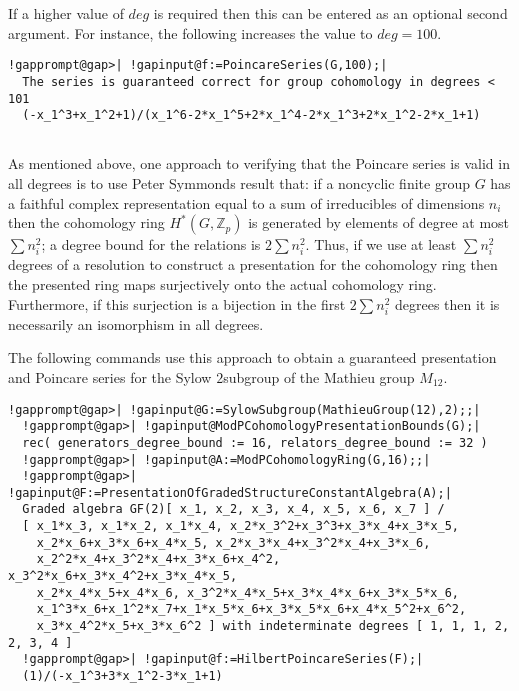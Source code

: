 \documentclass[a4paper,11pt]{report}
\begin{document}
{{\begin{Verbatim}[commandchars=!@|,fontsize=\small,frame=single,label=Example]
\end{Verbatim}
 

If a higher value of $deg$ is required then this can be entered as an optional second argument. For
instance, the following increases the value to $deg=100$. 
\begin{Verbatim}[commandchars=!@|,fontsize=\small,frame=single,label=Example]
  !gapprompt@gap>| !gapinput@f:=PoincareSeries(G,100);|
  The series is guaranteed correct for group cohomology in degrees < 101
  (-x_1^3+x_1^2+1)/(x_1^6-2*x_1^5+2*x_1^4-2*x_1^3+2*x_1^2-2*x_1+1)
  
\end{Verbatim}
 

 As mentioned above, one approach to verifying that the Poincare series is
valid in all degrees is to use Peter Symmonds result \cite{Symmonds} that: if a non\texttt{}cyclic finite group $G$ has a faithful complex representation equal to a sum of irreducibles of
dimensions $n_i$ then the cohomology ring $H^\ast(G,\mathbb Z_p)$ is generated by elements of degree at most $\sum n_i^2$; a degree bound for the relations is $2 \sum n_i^2$. Thus, if we use at least $\sum n_i^2$ degrees of a resolution to construct a presentation for the cohomology ring
then the presented ring maps surjectively onto the actual cohomology ring.
Furthermore, if this surjection is a bijection in the first $2 \sum n_i^2$ degrees then it is necessarily an isomorphism in all degrees. 

 The following commands use this approach to obtain a guaranteed presentation
and Poincare series for the Sylow $2$\texttt{}subgroup of the Mathieu group $M_{12}$. 
\begin{Verbatim}[commandchars=!@|,fontsize=\small,frame=single,label=Example]
  !gapprompt@gap>| !gapinput@G:=SylowSubgroup(MathieuGroup(12),2);;|
  !gapprompt@gap>| !gapinput@ModPCohomologyPresentationBounds(G);|
  rec( generators_degree_bound := 16, relators_degree_bound := 32 )
  !gapprompt@gap>| !gapinput@A:=ModPCohomologyRing(G,16);;|
  !gapprompt@gap>| !gapinput@F:=PresentationOfGradedStructureConstantAlgebra(A);|
  Graded algebra GF(2)[ x_1, x_2, x_3, x_4, x_5, x_6, x_7 ] / 
  [ x_1*x_3, x_1*x_2, x_1*x_4, x_2*x_3^2+x_3^3+x_3*x_4+x_3*x_5, 
    x_2*x_6+x_3*x_6+x_4*x_5, x_2*x_3*x_4+x_3^2*x_4+x_3*x_6, 
    x_2^2*x_4+x_3^2*x_4+x_3*x_6+x_4^2, x_3^2*x_6+x_3*x_4^2+x_3*x_4*x_5, 
    x_2*x_4*x_5+x_4*x_6, x_3^2*x_4*x_5+x_3*x_4*x_6+x_3*x_5*x_6, 
    x_1^3*x_6+x_1^2*x_7+x_1*x_5*x_6+x_3*x_5*x_6+x_4*x_5^2+x_6^2, 
    x_3*x_4^2*x_5+x_3*x_6^2 ] with indeterminate degrees [ 1, 1, 1, 2, 2, 3, 4 ]
  !gapprompt@gap>| !gapinput@f:=HilbertPoincareSeries(F);|
  (1)/(-x_1^3+3*x_1^2-3*x_1+1)
  

\end{Verbatim}}}
\end{document}
